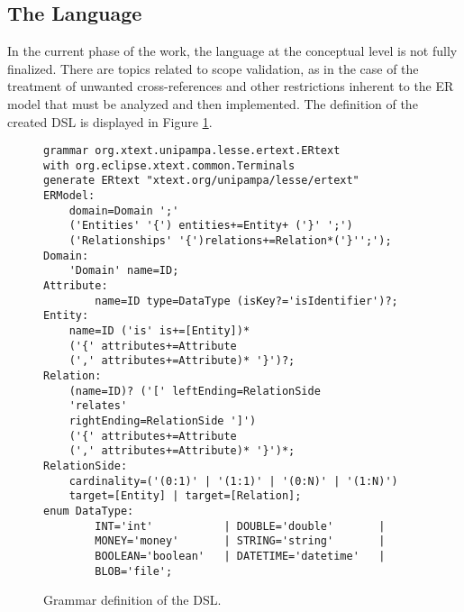 \documentclass[a4paper,twoside,anonymous]{article}
\begin{document}
%     

\subsection{The Language} \label{sec:EspecDSL}



In the current phase of the work, the language at the conceptual level is not fully finalized.
There are topics related to scope validation, as in the case of the treatment of unwanted cross-references and other restrictions inherent to the ER model that must be analyzed and then implemented.
The definition of the created DSL is displayed in Figure \ref{fig:DSLvsFinal}.

\lstset{basicstyle=\tiny}
\begin{figure}[!htb]
    \centering
    \begin{scriptsize}
    \begin{lstlisting}[language = Xtext , frame = trbl]
grammar org.xtext.unipampa.lesse.ertext.ERtext 
with org.eclipse.xtext.common.Terminals
generate ERtext "xtext.org/unipampa/lesse/ertext"
ERModel:
	domain=Domain ';'
	('Entities' '{') entities+=Entity+ ('}' ';')
	('Relationships' '{')relations+=Relation*('}'';');
Domain:
	'Domain' name=ID;
Attribute:
        name=ID type=DataType (isKey?='isIdentifier')?;
Entity:
	name=ID ('is' is+=[Entity])*
	('{' attributes+=Attribute 
	(',' attributes+=Attribute)* '}')?;
Relation:
	(name=ID)? ('[' leftEnding=RelationSide 
	'relates' 
	rightEnding=RelationSide ']') 
	('{' attributes+=Attribute 
	(',' attributes+=Attribute)* '}')*;
RelationSide:
	cardinality=('(0:1)' | '(1:1)' | '(0:N)' | '(1:N)') 
	target=[Entity] | target=[Relation];
enum DataType:
        INT='int'           | DOUBLE='double'       | 
        MONEY='money'       | STRING='string'       |
        BOOLEAN='boolean'   | DATETIME='datetime'   |
        BLOB='file';
    \end{lstlisting}
    \end{scriptsize}
    \caption{Grammar definition of the DSL.}
    \label{fig:DSLvsFinal}
\end{figure}
\end{document}
